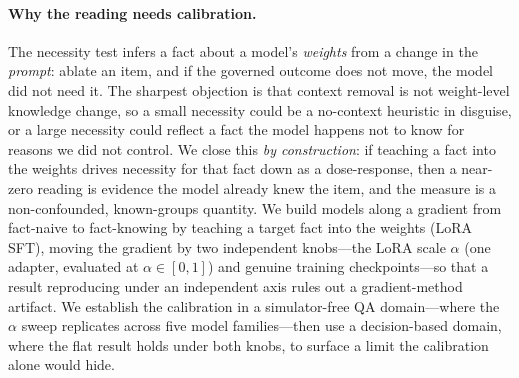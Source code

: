 \documentclass{article}
\begin{document}
\paragraph{Why the reading needs calibration.} The necessity test infers a fact about a model's
\emph{weights} from a change in the \emph{prompt}: ablate an item, and if the governed outcome does not
move, the model did not need it. The sharpest objection is that context removal is not weight-level
knowledge change, so a small necessity could be a no-context heuristic in disguise, or a large
necessity could reflect a fact the model happens not to know for reasons we did not control. We close
this \emph{by construction}: if teaching a fact into the weights drives necessity for that fact down as
a dose-response, then a near-zero reading is evidence the model already knew the item, and the measure
is a non-confounded, known-groups quantity. We build models along a gradient from fact-naive to
fact-knowing by teaching a target fact into the weights (LoRA SFT), moving the gradient by two
independent knobs---the LoRA scale $\alpha$ (one adapter, evaluated at $\alpha\in[0,1]$) and genuine
training checkpoints---so that a result reproducing under an independent axis rules out a
gradient-method artifact. We establish the calibration in a simulator-free QA domain---where the
$\alpha$ sweep replicates across five model families---then use a decision-based domain, where the flat
result holds under both knobs, to surface a limit the calibration alone would hide.
\end{document}
